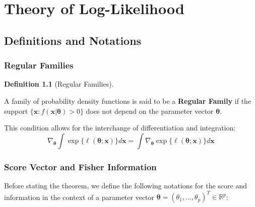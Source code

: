 \documentclass[
  letterpaper,
  DIV=11,
  numbers=noendperiod]{scrreprt}
\renewcommand{\[}{\begin{equation}}
\renewcommand{\]}{\end{equation}}
\theoremstyle{definition}
\newtheorem{definition}{Definition}[chapter]
\theoremstyle{plain}
\theoremstyle{plain}
\theoremstyle{plain}
\theoremstyle{definition}
\theoremstyle{plain}
\theoremstyle{remark}
\begin{document}

\chapter{Theory of Log-Likelihood}\label{theory-of-log-likelihood}

\section{Definitions and Notations}\label{definitions-and-notations}

\subsection{Regular Families}\label{regular-families}

\begin{definition}[Regular
Families]\protect\hypertarget{def-regular-family}{}\label{def-regular-family}

A family of probability density functions is said to be a
\textbf{Regular Family} if the support
\(\{\mathbf{x} : f(\mathbf{x}|\boldsymbol{\theta}) > 0\}\) does not
depend on the parameter vector \(\boldsymbol{\theta}\).

This condition allows for the interchange of differentiation and
integration: \[
\nabla_{\boldsymbol{\theta}} \int \exp\{\ell(\boldsymbol{\theta}; \mathbf{x})\} d\mathbf{x} = \int \nabla_{\boldsymbol{\theta}} \exp\{\ell(\boldsymbol{\theta}; \mathbf{x})\} d\mathbf{x}
\]

\end{definition}

\subsection{Score Vector and Fisher
Information}\label{score-vector-and-fisher-information}

Before stating the theorem, we define the following notations for the
score and information in the context of a parameter vector
\(\boldsymbol{\theta} = (\theta_1, \dots, \theta_p)^T \in \mathbb{R}^p\):
\end{document}
